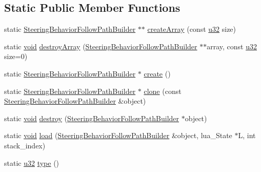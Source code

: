 \subsection*{Static Public Member Functions}
\begin{DoxyCompactItemize}
\item 
static \mbox{\hyperlink{classnjli_1_1_steering_behavior_follow_path_builder}{Steering\+Behavior\+Follow\+Path\+Builder}} $\ast$$\ast$ \mbox{\hyperlink{classnjli_1_1_steering_behavior_follow_path_builder_a05cc13a4fe768aafab949ad750992d46}{create\+Array}} (const \mbox{\hyperlink{_util_8h_a10e94b422ef0c20dcdec20d31a1f5049}{u32}} size)
\item 
static \mbox{\hyperlink{_thread_8h_af1e856da2e658414cb2456cb6f7ebc66}{void}} \mbox{\hyperlink{classnjli_1_1_steering_behavior_follow_path_builder_af65a2e1a8ad421ea99bf55b4dd1087de}{destroy\+Array}} (\mbox{\hyperlink{classnjli_1_1_steering_behavior_follow_path_builder}{Steering\+Behavior\+Follow\+Path\+Builder}} $\ast$$\ast$array, const \mbox{\hyperlink{_util_8h_a10e94b422ef0c20dcdec20d31a1f5049}{u32}} size=0)
\item 
static \mbox{\hyperlink{classnjli_1_1_steering_behavior_follow_path_builder}{Steering\+Behavior\+Follow\+Path\+Builder}} $\ast$ \mbox{\hyperlink{classnjli_1_1_steering_behavior_follow_path_builder_a8f31ab518628db64017311fcabcefc5e}{create}} ()
\item 
static \mbox{\hyperlink{classnjli_1_1_steering_behavior_follow_path_builder}{Steering\+Behavior\+Follow\+Path\+Builder}} $\ast$ \mbox{\hyperlink{classnjli_1_1_steering_behavior_follow_path_builder_ad485a7eec809a2401a05e4d8a69ee756}{clone}} (const \mbox{\hyperlink{classnjli_1_1_steering_behavior_follow_path_builder}{Steering\+Behavior\+Follow\+Path\+Builder}} \&object)
\item 
static \mbox{\hyperlink{_thread_8h_af1e856da2e658414cb2456cb6f7ebc66}{void}} \mbox{\hyperlink{classnjli_1_1_steering_behavior_follow_path_builder_a9a44746973699b2b239d830111d45f58}{destroy}} (\mbox{\hyperlink{classnjli_1_1_steering_behavior_follow_path_builder}{Steering\+Behavior\+Follow\+Path\+Builder}} $\ast$object)
\item 
static \mbox{\hyperlink{_thread_8h_af1e856da2e658414cb2456cb6f7ebc66}{void}} \mbox{\hyperlink{classnjli_1_1_steering_behavior_follow_path_builder_a1c3b7eedc87079a4c9464b52ef2d5a44}{load}} (\mbox{\hyperlink{classnjli_1_1_steering_behavior_follow_path_builder}{Steering\+Behavior\+Follow\+Path\+Builder}} \&object, lua\+\_\+\+State $\ast$L, int stack\+\_\+index)
\item 
static \mbox{\hyperlink{_util_8h_a10e94b422ef0c20dcdec20d31a1f5049}{u32}} \mbox{\hyperlink{classnjli_1_1_steering_behavior_follow_path_builder_af658f0273f4e86148d45654eae482be1}{type}} ()
\end{DoxyCompactItemize}
